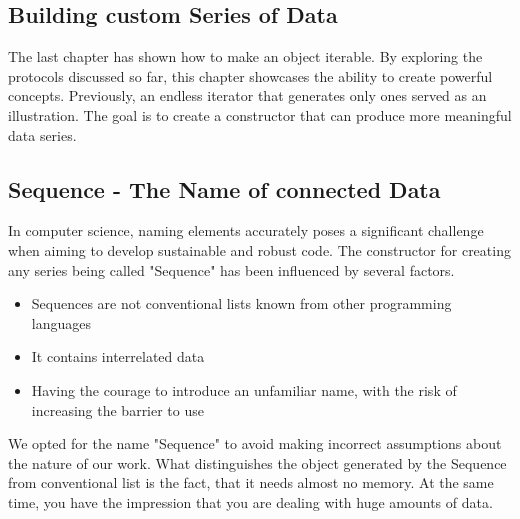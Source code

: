 \subsection{Building custom Series of Data}
\label{sub:Building custom Series of Data}
The last chapter has shown how to make an object iterable. By exploring the 
protocols discussed so far, this chapter showcases the ability to create 
powerful concepts. Previously, an endless iterator that generates only ones 
served as an illustration. The goal is to create a constructor that can 
produce more meaningful data series.

\subsection{Sequence - The Name of connected Data}
\label{sub:Sequence - The Name of connected Data}
In computer science, naming elements accurately poses a significant challenge 
when aiming to develop sustainable and robust code. The constructor for creating 
any series being called "Sequence" has been influenced by several factors. 

\begin{itemize}
  \item{Sequences are not conventional lists known from other programming languages}
  \item{It contains interrelated data}
  \item{Having the courage to introduce an unfamiliar name, with the risk of increasing the barrier to use}
\end{itemize}

We opted for the name "Sequence" to avoid making incorrect assumptions about 
the nature of our work.
\newline
What distinguishes the object generated by the Sequence from conventional list
is the fact, that it needs almost no memory. At the same time, you have the 
impression that you are dealing with huge amounts of data.

